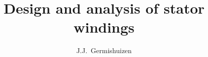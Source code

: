 \documentclass[10pt,a4paper]{book}
\title{Design and analysis of stator windings}
\author{J.J.~Germishuizen}
\begin{document}
\frontmatter

\newtheorem{exercise}{Exercise}[chapter]

\sloppy

\setlength{\headsep}{3ex}
\setlength{\parindent}{0.0in}
\setlength{\parskip}{1.7ex plus 0.5ex minus 0.5ex}
\renewcommand{\baselinestretch}{1.02}

\setlength{\topsep}{-0.0\parskip}
\setlength{\partopsep}{-0.5\parskip}
\setlength{\itemindent}{0.0in}
\setlength{\listparindent}{0.0in}

\makeatletter

\renewcommand{\section}{\@startsection 
    {section} {1} {0mm}%
    {-3.5ex \@plus -1ex \@minus -.2ex}%
    {0.7ex \@plus.2ex}%
    {\normalfont\Large\bfseries}}
\renewcommand\subsection{\@startsection {subsection}{2}{0mm}%
    {-3.25ex\@plus -1ex \@minus -.2ex}%
    {0.3ex \@plus .2ex}%
    {\normalfont\large\bfseries}}
\renewcommand\subsubsection{\@startsection {subsubsection}{3}{0mm}%
    {-3.25ex\@plus -1ex \@minus -.2ex}%
    {0.3ex \@plus .2ex}%
    {\normalfont\normalsize\bfseries}}

\renewcommand{\l@section}{\@dottedtocline{1}{1.5em}{3.0em}}
\setcounter{tocdepth}{1}

\def\thm@space@setup{%
  \thm@preskip=0.35cm plus 0.2cm minus 0.2cm
  \thm@postskip=\thm@preskip %
}

\makeatother

\newcommand{\beforefig}{\vspace{1.3\parskip}}
\newcommand{\afterfig}{\vspace{-0.2\parskip}}

\newcommand{\beforeverb}{\vspace{0.6\parskip}}
\newcommand{\afterverb}{\vspace{0.6\parskip}}

\newcommand{\adjustpage}[1]{\enlargethispage{#1\baselineskip}}
\end{document}
